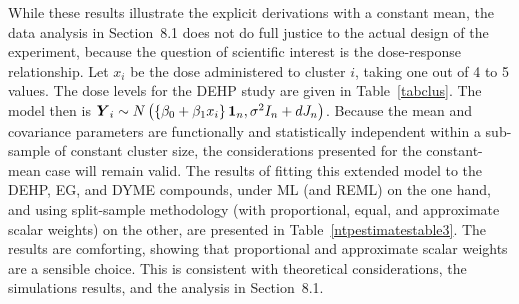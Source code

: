 \documentclass[11pt,a5paper,twoside]{book}
\newcommand{\BY}{\mbox{\boldmath $Y$}}
\begin{document}
While these results illustrate the explicit derivations  with a constant mean, the data analysis in Section~8.1
does not do full justice to the actual design of the experiment, because the question of  scientific interest is the 
dose-response relationship. Let $x_i$ be the dose administered to 
cluster $i$, taking one out of 4 to 5 values. The dose 
levels for the DEHP study are given in Table~\ref{tabclus}. The model 
then is $\BY_i\sim N\left(\left\{\beta_0+\beta_1x_i\right\}\mathbf{1}_n,\sigma^2 I_{n}+d J_{n}\right)$. 
Because the mean and covariance parameters are functionally and 
statistically independent within a sub-sample of constant cluster size, 
the considerations presented for the constant-mean case will remain valid. 
The results of fitting this extended model to the DEHP, EG, and DYME compounds, 
under ML (and REML) on the one hand, and using split-sample methodology 
(with proportional, equal, and approximate scalar weights) on the other, 
are presented in Table~\ref{ntpestimatestable3}. The results are  
comforting, showing that proportional and approximate scalar weights are a sensible choice. This is consistent with theoretical considerations, 
the simulations results, and the analysis in Section~8.1.
\end{document}
